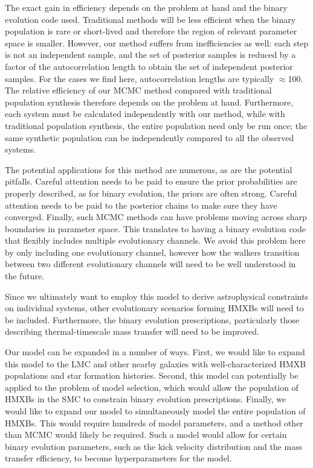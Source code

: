 \documentclass[usenatbib]{mnras}
\begin{document}
The exact gain in efficiency depends on the problem at hand and the binary evolution code used. Traditional methods will be less efficient when the binary population is rare or short-lived and therefore the region of relevant parameter space is smaller. However, our method suffers from inefficiencies as well: each step is not an independent sample, and the set of posterior samples is reduced by a factor of the autocorrelation length to obtain the set of independent posterior samples. For the cases we find here, autocorrelation lengths are typically $\approx$100. The relative efficiency of our MCMC method compared with traditional population synthesis therefore depends on the problem at hand. Furthermore, each system must be calculated independently with our method, while with traditional population synthesis, the entire population need only be run once; the same synthetic population can be independently compared to all the observed systems.

The potential applications for this method are numerous, as are the potential pitfalls. Careful attention needs to be paid to ensure the prior probabilities are properly described, as for binary evolution, the priors are often strong. Careful attention needs to be paid to the posterior chains to make sure they have converged. Finally, such MCMC methods can have problems moving across sharp boundaries in parameter space. This translates to having a binary evolution code that flexibly includes multiple evolutionary channels. We avoid this problem here by only including one evolutionary channel, however how the walkers transition between two different evolutionary channels will need to be well understood in the future. 

Since we ultimately want to employ this model to derive astrophysical constraints on individual systems, other evolutionary scenarios forming HMXBs will need to be included. Furthermore, the binary evolution prescriptions, particularly those describing thermal-timescale mass transfer will need to be improved. 

Our model can be expanded in a number of ways. First, we would like to expand this model to the LMC and other nearby galaxies with well-characterized HMXB populations and star formation histories. Second, this model can potentially be applied to the problem of model selection, which would allow the population of HMXBs in the SMC to constrain binary evolution prescriptions. Finally, we would like to expand our model to simultaneously model the entire population of HMXBs. This would require hundreds of model parameters, and a method other than MCMC would likely be required. Such a model would allow for certain binary evolution parameters, such as the kick velocity distribution and the mass transfer efficiency, to become hyperparameters for the model. 
\end{document}

